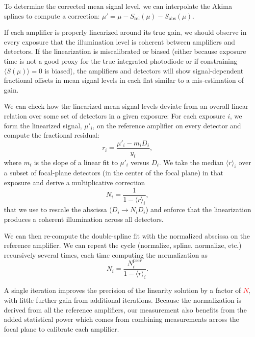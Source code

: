 To determine the corrected mean signal level, we can interpolate the Akima splines to compute a correction: $\mu' = \mu - S_{\mathrm{rel}}(\mu) - S_{\mathrm{abs}}(\mu)$.

If each amplifier is properly linearized around its true gain, we should observe in every exposure that the illumination level is coherent between amplifiers and detectors.
If the linearization is miscalibrated or biased (either because exposure time is not a good proxy for the true integrated photodiode or if constraining $\langle S(\mu)\rangle = 0$ is biased), the amplifiers and detectors will show signal-dependent fractional offsets in mean signal levels in each flat similar to a mis-estimation of gain.

We can check how the linearized mean signal levels deviate from an overall linear relation over some set of detectors in a given exposure:
For each exposure $i$, we form the linearized signal, $\mu'_i$, on the reference amplifier on every detector and compute the fractional residual:
\begin{equation}
    r_i = \frac{\mu'_i - m_i D_{i}}{y_i},
\end{equation}
where $m_i$ is the slope of a linear fit to $\mu'_i$ versus $D_{i}$.
We take the median $\langle r \rangle_i$ over a subset of focal-plane detectors (in the center of the focal plane) in that exposure and derive a multiplicative correction
\begin{equation}
    N_i = \frac{1}{1 - \langle r \rangle_i},
\end{equation} that we use to rescale the abscissa ($D_{i} \rightarrow N_i D_{i}$) and enforce that the linearization produces a coherent illumination across all detectors.

We can then re-compute the double-spline fit with the normalized abscissa on the reference amplifier. We can repeat the cycle (normalize, spline, normalize, etc.) recursively several times, each time computing the normalization as \begin{equation}
    N_i = \frac{N_i^{\mathrm{prev}}}{1 - \langle r \rangle_i}.
\end{equation}

A single iteration improves the precision of the linearity solution by a factor of \textcolor{red}{$N$}, with little further gain from additional iterations. Because the normalization is derived from all the reference amplifiers, our measurement also benefits from the added statistical power which comes from combining measurements across the focal plane to calibrate each amplifier.

